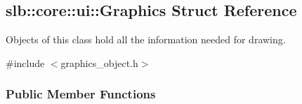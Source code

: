 \hypertarget{structslb_1_1core_1_1ui_1_1Graphics}{}\subsection{slb\+:\+:core\+:\+:ui\+:\+:Graphics Struct Reference}
\label{structslb_1_1core_1_1ui_1_1Graphics}


Objects of this class hold all the information needed for drawing.  




{\ttfamily \#include $<$graphics\+\_\+object.\+h$>$}

\subsubsection*{Public Member Functions}
